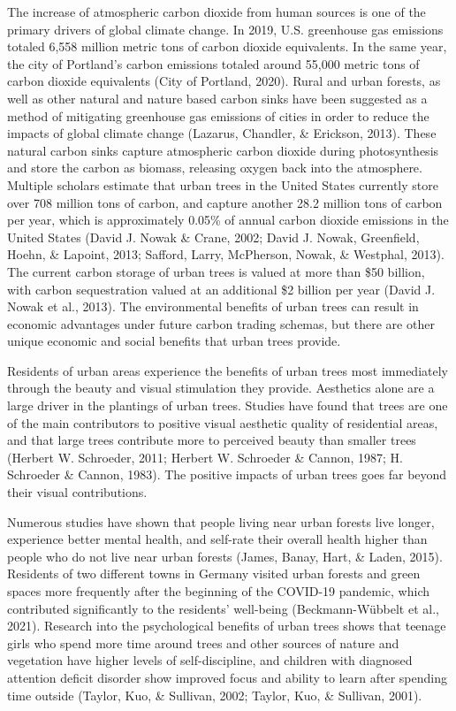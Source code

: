\documentclass[12pt,twoside]{reedthesis}
\begin{document}
The increase of atmospheric carbon dioxide from human sources is one of
the primary drivers of global climate change. In 2019, U.S. greenhouse
gas emissions totaled 6,558 million metric tons of carbon dioxide
equivalents. In the same year, the city of Portland's carbon emissions
totaled around 55,000 metric tons of carbon dioxide equivalents
(City of Portland, 2020). Rural and urban forests, as well as other natural and
nature based carbon sinks have been suggested as a method of mitigating
greenhouse gas emissions of cities in order to reduce the impacts of
global climate change (Lazarus, Chandler, \& Erickson, 2013). These natural carbon sinks capture
atmospheric carbon dioxide during photosynthesis and store the carbon as
biomass, releasing oxygen back into the atmosphere. Multiple scholars
estimate that urban trees in the United States currently store over 708
million tons of carbon, and capture another 28.2 million tons of carbon
per year, which is approximately 0.05\% of annual carbon dioxide
emissions in the United States (David J. Nowak \& Crane, 2002; David J. Nowak, Greenfield, Hoehn, \& Lapoint, 2013; Safford, Larry, McPherson, Nowak, \& Westphal, 2013).
The current carbon storage of urban trees is valued at more than \$50
billion, with carbon sequestration valued at an additional \$2 billion
per year (David J. Nowak et al., 2013). The environmental benefits of urban trees can
result in economic advantages under future carbon trading schemas, but
there are other unique economic and social benefits that urban trees
provide.

Residents of urban areas experience the benefits of urban trees most
immediately through the beauty and visual stimulation they provide.
Aesthetics alone are a large driver in the plantings of urban trees.
Studies have found that trees are one of the main contributors to
positive visual aesthetic quality of residential areas, and that large
trees contribute more to perceived beauty than smaller trees
(Herbert W. Schroeder, 2011; Herbert W. Schroeder \& Cannon, 1987; H. Schroeder \& Cannon, 1983). The positive impacts
of urban trees goes far beyond their visual contributions.

Numerous studies have shown that people living near urban forests live
longer, experience better mental health, and self-rate their overall
health higher than people who do not live near urban forests
(James, Banay, Hart, \& Laden, 2015). Residents of two different towns in Germany visited urban
forests and green spaces more frequently after the beginning of the
COVID-19 pandemic, which contributed significantly to the residents'
well-being (Beckmann-Wübbelt et al., 2021). Research into the psychological
benefits of urban trees shows that teenage girls who spend more time
around trees and other sources of nature and vegetation have higher
levels of self-discipline, and children with diagnosed attention deficit
disorder show improved focus and ability to learn after spending time
outside (Taylor, Kuo, \& Sullivan, 2002; Taylor, Kuo, \& Sullivan, 2001).
\end{document}
